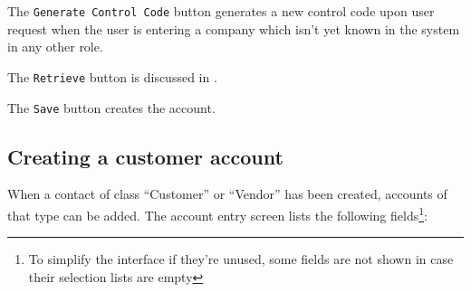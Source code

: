 The \texttt{Generate Control Code} button generates a new control code upon
user request when the user is entering a company which isn't yet known
in the system in any other role.

The \texttt{Retrieve} button is discussed in .

The \texttt{Save} button creates the account.

\subsection{Creating a customer account}
\label{subsec-business-processes-customers-creating-account}

When a contact of class ``Customer'' or ``Vendor'' has been created,
accounts of that type can be added. The account entry screen lists the
following fields\footnote{To simplify the interface if they're unused, some fields
are not shown in case their selection lists are empty}:

